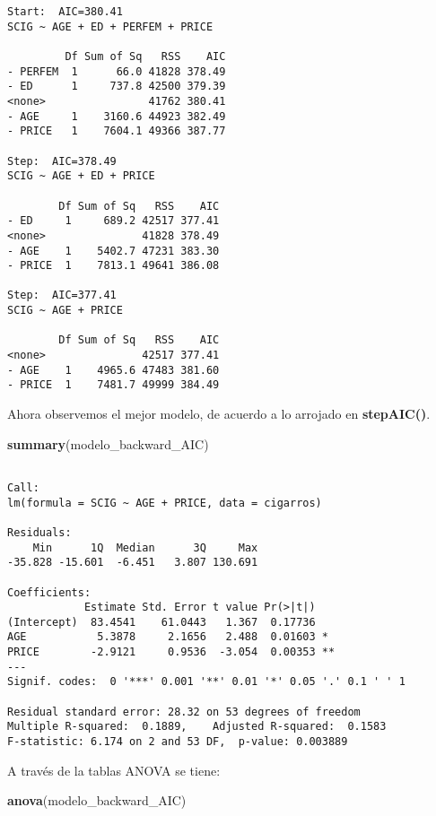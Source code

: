 \documentclass[
  a4paper,
  oneside,
  openany]{book}
\newenvironment{Shaded}{\begin{snugshade}}{\end{snugshade}}
\newcommand{\FunctionTok}[1]{\textcolor[rgb]{0.13,0.29,0.53}{\textbf{#1}}}
\newcommand{\NormalTok}[1]{#1}
\begin{document}
\begin{verbatim}
Start:  AIC=380.41
SCIG ~ AGE + ED + PERFEM + PRICE

         Df Sum of Sq   RSS    AIC
- PERFEM  1      66.0 41828 378.49
- ED      1     737.8 42500 379.39
<none>                41762 380.41
- AGE     1    3160.6 44923 382.49
- PRICE   1    7604.1 49366 387.77

Step:  AIC=378.49
SCIG ~ AGE + ED + PRICE

        Df Sum of Sq   RSS    AIC
- ED     1     689.2 42517 377.41
<none>               41828 378.49
- AGE    1    5402.7 47231 383.30
- PRICE  1    7813.1 49641 386.08

Step:  AIC=377.41
SCIG ~ AGE + PRICE

        Df Sum of Sq   RSS    AIC
<none>               42517 377.41
- AGE    1    4965.6 47483 381.60
- PRICE  1    7481.7 49999 384.49
\end{verbatim}

Ahora observemos el mejor modelo, de acuerdo a lo arrojado en \textbf{stepAIC()}.

\begin{Shaded}
\begin{Highlighting}[]
\FunctionTok{summary}\NormalTok{(modelo\_backward\_AIC)}
\end{Highlighting}
\end{Shaded}

\begin{verbatim}

Call:
lm(formula = SCIG ~ AGE + PRICE, data = cigarros)

Residuals:
    Min      1Q  Median      3Q     Max 
-35.828 -15.601  -6.451   3.807 130.691 

Coefficients:
            Estimate Std. Error t value Pr(>|t|)   
(Intercept)  83.4541    61.0443   1.367  0.17736   
AGE           5.3878     2.1656   2.488  0.01603 * 
PRICE        -2.9121     0.9536  -3.054  0.00353 **
---
Signif. codes:  0 '***' 0.001 '**' 0.01 '*' 0.05 '.' 0.1 ' ' 1

Residual standard error: 28.32 on 53 degrees of freedom
Multiple R-squared:  0.1889,    Adjusted R-squared:  0.1583 
F-statistic: 6.174 on 2 and 53 DF,  p-value: 0.003889
\end{verbatim}

A través de la tablas ANOVA se tiene:

\begin{Shaded}
\begin{Highlighting}[]
\FunctionTok{anova}\NormalTok{(modelo\_backward\_AIC)}
\end{Highlighting}
\end{Shaded}
\end{document}
